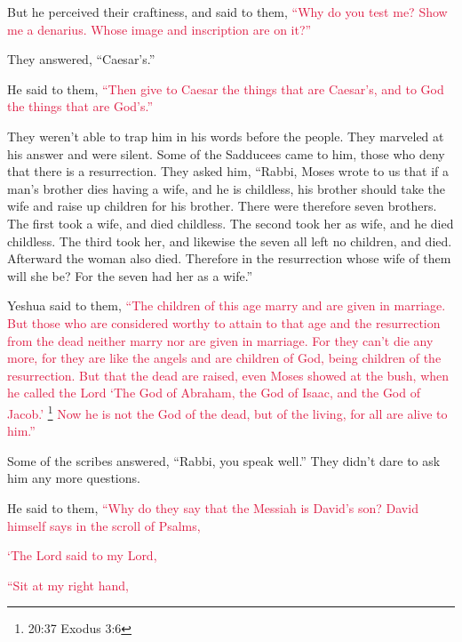 \myverse{}But he perceived their craftiness, and said to them,
\textcolor{crimson}{“Why do you test me?
}
\myverse{}\textcolor{crimson}{Show me a denarius. Whose image and inscription are on it?”
}

They answered, “Caesar’s.”

\myverse{}He said to them,
\textcolor{crimson}{“Then give to Caesar the things that are Caesar’s, and to God the things that are God’s.”}

\myverse{}They weren’t able to trap him in his words before the people.
They marveled at his answer and were silent.
\myverse{}Some of the Sadducees came to him, those who deny that there is a resurrection.
\myverse{}They asked him, “Rabbi, Moses wrote to us that if a man’s brother dies having
a wife, and he is childless, his brother should take the wife and raise up children for his brother.
\myverse{}There were therefore seven brothers. The first took a wife, and died childless.
\myverse{}The second took her as wife, and he died childless.
\myverse{}The third took her, and likewise the seven all left no children, and died.
\myverse{}Afterward the woman also died.
\myverse{}Therefore in the resurrection whose wife of them will she be? For the seven
had her as a wife.”

\myverse{}Yeshua said to them,
\textcolor{crimson}{“The children of this age marry and are given in marriage.
}
\myverse{}\textcolor{crimson}{But those who are considered worthy to attain to that age and the resurrection
	from the dead neither marry nor are given in marriage.
}
\myverse{}\textcolor{crimson}{For they can’t die any more, for they are like the angels and are children
	of God, being children of the resurrection.
}
\myverse{}\textcolor{crimson}{But that the dead are raised, even Moses showed at the bush, when he
	called the Lord ‘The God of Abraham, the God of Isaac, and the God of Jacob.’
}\footnote{ 20:37 Exodus 3:6}
\myverse{}\textcolor{crimson}{Now he is not the God of the dead, but of the living, for all are alive
	to him.”}

\myverse{}Some of the scribes answered, “Rabbi, you speak well.”
\myverse{}They didn’t dare to ask him any more questions.

\myverse{}He said to them,
\textcolor{crimson}{“Why do they say that the Messiah is David’s son?
}
\myverse{}\textcolor{crimson}{David himself says in the scroll of Psalms,}

\textcolor{crimson}{‘The Lord said to my Lord,}

\textcolor{crimson}{“Sit at my right hand,}

